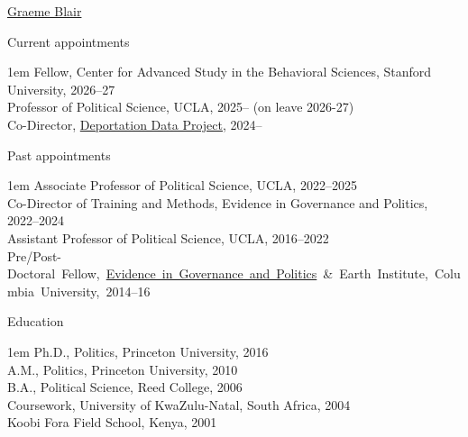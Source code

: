 \documentclass[10.9pt]{article}
\makeatletter
\newcommand\donotbreakhere{\par\nobreak\@afterheading\vspace{1em}}
\newenvironment{indnt}{\begin{adjustwidth}{1em}{}}{\end{adjustwidth}}
\makeatother
\begin{document}
{\huge \href{https://graemeblair.com}{Graeme Blair}}

\vspace{2.75em}

{\large  Current appointments}\donotbreakhere
\begin{indnt}
Fellow, Center for Advanced Study in the Behavioral Sciences, Stanford University, 2026--27\\[.75em]
Professor of Political Science, UCLA, 2025-- (on leave 2026-27) \\[.75em]
Co-Director, \href{https://deportationdata.org}{Deportation Data Project}, 2024--
\end{indnt}
\vspace{1.5em}

{\large  Past appointments}\donotbreakhere
\begin{indnt}
Associate Professor of Political Science, UCLA, 2022--2025\\[.75em]
Co-Director of Training and Methods, Evidence in Governance and Politics, 2022--2024\\[.75em]
Assistant Professor of Political Science, UCLA, 2016--2022 \\[.75em]
\mbox{Pre/Post-Doctoral Fellow, \href{http://egap.org}{Evidence in Governance and Politics} \& Earth Institute, 
\mbox{Columbia University}, 2014--16}
\end{indnt}
\vspace{1.5em}

{\large Education}\donotbreakhere
\begin{indnt}
Ph.D., Politics, Princeton University, 2016 \\[.75em]
A.M., Politics, Princeton University, 2010 \\[.75em]
B.A., Political Science, Reed College, 2006 \\[.45em]
\phantom{~~} Coursework, University of KwaZulu-Natal, South Africa, 2004 \\[.25em]
\phantom{~~} Koobi Fora Field School, Kenya, 2001
\end{indnt}
\vspace{1.5em}
\end{document}
